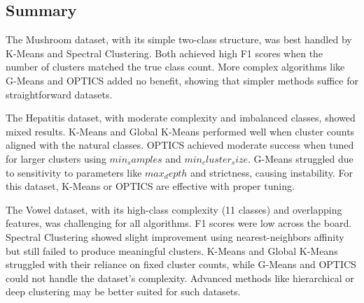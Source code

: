 \subsection{Summary}
\label{subsec:resultssummary}

The Mushroom dataset, with its simple two-class structure, was best handled by K-Means and Spectral Clustering.
Both achieved high F1 scores when the number of clusters matched the true class count.
More complex algorithms like G-Means and OPTICS added no benefit, showing that simpler methods suffice for straightforward datasets.

The Hepatitis dataset, with moderate complexity and imbalanced classes, showed mixed results.
K-Means and Global K-Means performed well when cluster counts aligned with the natural classes. 
OPTICS achieved moderate success when tuned for larger clusters using $min_samples$ and $min_cluster_size$. 
G-Means struggled due to sensitivity to parameters like $max_depth$ and strictness, causing instability.
For this dataset, K-Means or OPTICS are effective with proper tuning.

The Vowel dataset, with its high-class complexity (11 classes) and overlapping features, was 
challenging for all algorithms. F1 scores were low across the board. Spectral Clustering showed slight 
improvement using nearest-neighbors affinity but still failed to produce meaningful clusters. K-Means 
and Global K-Means struggled with their reliance on fixed cluster counts, while G-Means and OPTICS 
could not handle the dataset's complexity. Advanced methods like hierarchical or 
deep clustering may be better suited for such datasets.